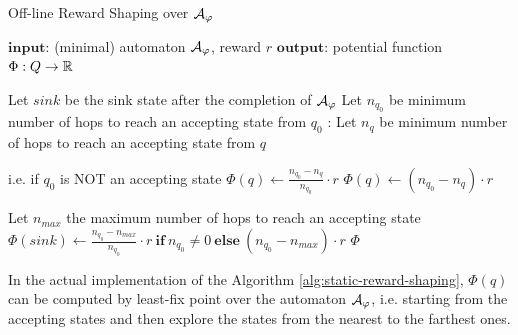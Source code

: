 \begin{algorithm}
	\caption{Off-line Reward Shaping over $\mathcal{A}_{\varphi}$}
	\label{alg:static-reward-shaping}
	\begin{algorithmic}[1]
		\State $\mathbf{input}$: (minimal) automaton $\mathcal{A}_\varphi$, reward $r$
		\State $\mathbf{output}$: potential function $\Phi: Q\to \mathbb{R}$
		
		\State Let $sink$ be the sink state after the completion of $\mathcal{A}_{\varphi}$
		\State Let $n_{q_0}$ be minimum number of hops to reach an accepting state from $q_0$ \label{alg-line:q0-distance}
		:
			\State Let $n_q$ be minimum number of hops to reach an accepting state from $q$ \label{alg-line:q-distance}
			
			 \Comment i.e. if $q_0$ is NOT an accepting state
				\State $\Phi(q) \gets \frac{n_{q_0} - n_q}{n_{q_0}} \cdot r$
			\Else	
				\State $\Phi(q) \gets (n_{q_0} - n_q) \cdot r$
			\EndIf

		\EndFor
		
		\State Let $n_{max}$ the maximum number of hops  to reach an accepting state \label{alg-line:max-distance}
		\State $\Phi(sink) \gets \frac{n_{q_0} - n_{max}}{n_{q_0}} \cdot r \ \mathbf{if}\  n_{q_0}\neq 0 \ \mathbf{else}\  (n_{q_0} - n_{max}) \cdot r$ 
		\State \Return $\Phi$
 	\end{algorithmic}

\end{algorithm}

In the actual implementation of the Algorithm \ref{alg:static-reward-shaping}, $\Phi(q)$ can be computed  by least-fix point over the automaton $\mathcal{A}_\varphi$, i.e. starting from the accepting states and then explore the states from the nearest to the farthest ones.

